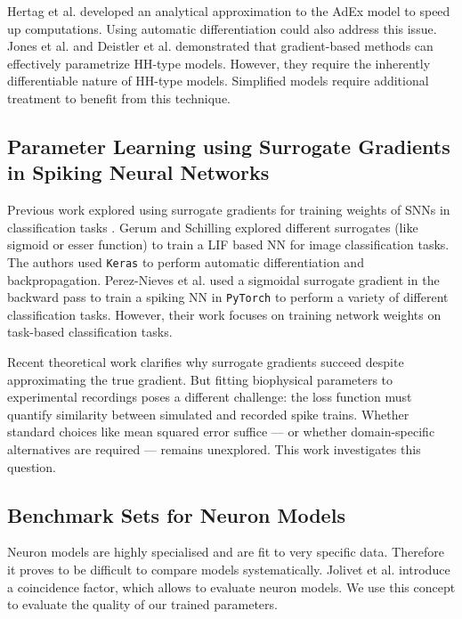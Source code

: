 \documentclass[conference]{IEEEtran}
\begin{document}
Hertag et al. \cite{Hertag2011} developed an analytical approximation to the AdEx model to speed up computations.
Using automatic differentiation could also address this issue.
Jones et al. \cite{Jones2024} and Deistler et al. \cite{Deistler2025} demonstrated that gradient-based methods can effectively parametrize HH-type models.
However, they require the inherently differentiable nature of HH-type models.
Simplified models require additional treatment to benefit from this technique.

\subsection{Parameter Learning using Surrogate Gradients in Spiking Neural Networks}
Previous work explored using surrogate gradients for training weights of \acp{SNN} in classification tasks \cite{Neftci2019, Gerum2021, Perez-Nieves2021}.
Gerum and Schilling \cite{Gerum2021} explored different surrogates (like sigmoid or esser function) to train a \ac{LIF} based \ac{NN} for image classification tasks.
The authors used \texttt{Keras} to perform automatic differentiation and backpropagation.
Perez-Nieves et al. \cite{Perez-Nieves2021} used a sigmoidal surrogate gradient in the backward pass to train a spiking NN in \texttt{PyTorch} to perform a variety of different classification tasks.
However, their work focuses on training network weights on task-based classification tasks.

Recent theoretical work \cite{Gygax2025} clarifies why surrogate gradients succeed despite approximating the true gradient.
But fitting biophysical parameters to experimental recordings poses a different challenge:
the loss function must quantify similarity between simulated and recorded spike trains.
Whether standard choices like mean squared error suffice --- 
or whether domain-specific alternatives are required --- 
remains unexplored.
This work investigates this question.

\subsection{Benchmark Sets for Neuron Models}
Neuron models are highly specialised and are fit to very specific data.
Therefore it proves to be difficult to compare models systematically.
Jolivet et al. \cite{Jolivet2008} introduce a coincidence factor, which allows to evaluate neuron models.
We use this concept to evaluate the quality of our trained parameters.
\end{document}
